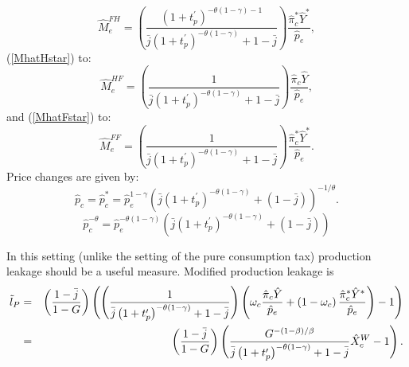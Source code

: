 \documentclass[notitlepage,12pt]{article}
\begin{document}
\begin{equation*}
\hat{M}_{e}^{FH}=\left( \frac{\left( 1+t_{p}^{\prime }\right) ^{-\theta
\left( 1-\gamma \right) -1}}{\bar{j}\left( 1+t_{p}^{\prime }\right)
^{-\theta \left( 1-\gamma \right) }+1-\bar{j}}\right) \frac{\hat{\pi}%
_{c}^{\ast }\hat{Y}^{\ast }}{\hat{p}_{e}},
\end{equation*}%
(\ref{MhatHstar}) to:%
\begin{equation*}
\hat{M}_{e}^{HF}=\left( \frac{1}{\bar{j}\left( 1+t_{p}^{\prime }\right)
^{-\theta \left( 1-\gamma \right) }+1-\bar{j}}\right) \frac{\hat{\pi}_{c}%
\hat{Y}}{\hat{p}_{e}},
\end{equation*}%
and (\ref{MhatFstar}) to:%
\begin{equation*}
\hat{M}_{e}^{FF}=\left( \frac{1}{\bar{j}\left( 1+t_{p}^{\prime }\right)
^{-\theta \left( 1-\gamma \right) }+1-\bar{j}}\right) \frac{\hat{\pi}%
_{c}^{\ast }\hat{Y}^{\ast }}{\hat{p}_{e}}.
\end{equation*}%
Price changes are given by:%
\begin{equation*}
\hat{p}_{c}=\hat{p}_{c}^{\ast }=\hat{p}_{e}^{1-\gamma }\left( \bar{j}\left(
1+t_{p}^{\prime }\right) ^{-\theta \left( 1-\gamma \right) }+\left( 1-\bar{j}%
\right) \right) ^{-1/\theta }.
\end{equation*}%
\begin{equation*}
\hat{p}_{c}^{-\theta }=\hat{p}_{e}^{-\theta \left( 1-\gamma \right) }\left( 
\bar{j}\left( 1+t_{p}^{\prime }\right) ^{-\theta \left( 1-\gamma \right)
}+\left( 1-\bar{j}\right) \right)
\end{equation*}

In this setting (unlike the setting of the pure consumption tax) production
leakage should be a useful measure. Modified production leakage is%
\begin{eqnarray*}
\tilde{l}_{P} &=&\left( \frac{1-\bar{j}}{1-G}\right) \left( \left( \frac{1}{%
\bar{j}\left( 1+t_{p}^{\prime }\right) ^{-\theta \left( 1-\gamma \right) }+1-%
\bar{j}}\right) \left( \omega _{c}\frac{\hat{\pi}_{c}\hat{Y}}{\hat{p}_{e}}%
+\left( 1-\omega _{c}\right) \frac{\hat{\pi}_{c}^{\ast }\hat{Y}^{\ast }}{%
\hat{p}_{e}}\right) -1\right) \\
&=&\left( \frac{1-\bar{j}}{1-G}\right) \left( \frac{G^{-\left( 1-\beta
\right) /\beta }}{\bar{j}\left( 1+t_{p}^{\prime }\right) ^{-\theta \left(
1-\gamma \right) }+1-\bar{j}}\hat{X}_{c}^{W}-1\right) .
\end{eqnarray*}
\end{document}
